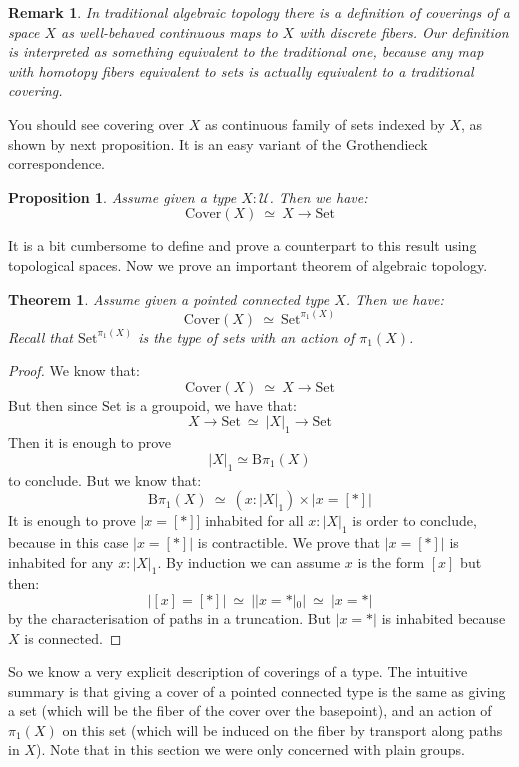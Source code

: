 \documentclass{article}
\newcommand{\U}{{\mathcal U}}
\renewcommand{\r}{\rightarrow}
\newcommand{\B}{\mathrm{B}}
\newcommand{\Set}{\mathrm{Set}}
\newtheorem{proposition}{Proposition}
\newtheorem{theorem}{Theorem}
\newtheorem{remark}{Remark}
\begin{document}
\begin{remark}
In traditional algebraic topology there is a definition of coverings of a space $X$ as well-behaved continuous maps to $X$ with discrete fibers. Our definition is interpreted as something equivalent to the traditional one, because any map with homotopy fibers equivalent to sets is actually equivalent to a traditional covering.
\end{remark}

You should see covering over $X$ as continuous family of sets indexed by $X$, as shown by next proposition. It is an easy variant of the Grothendieck correspondence.

\begin{proposition}
Assume given a type $X:\U$. Then we have:
\[\mathrm{Cover}(X) \ \simeq\ X \r \Set\]
\end{proposition}

It is a bit cumbersome to define and prove a counterpart to this result using topological spaces. Now we prove an important theorem of algebraic topology.

\begin{theorem}
Assume given a pointed connected type $X$. Then we have:
\[\mathrm{Cover}(X) \ \simeq\ \Set^{\pi_1(X)}\]
Recall that $\Set^{\pi_1(X)}$ is the type of sets with an action of $\pi_1(X)$.
\end{theorem}
\begin{proof}
We know that:
\[\mathrm{Cover}(X)\ \simeq\ X\r \Set\]
But then since $\Set$ is a groupoid, we have that:
\[X\r\Set \ \simeq\ |X|_1\r \Set\]
Then it is enough to prove 
\[|X|_1 \simeq \B\pi_1(X)\] 
to conclude. But we know that:
\[\B\pi_1(X) \ \simeq \ (x:|X|_1)\times |x=[*]|\]
It is enough to prove $|x=[*]]$ inhabited for all $x:|X|_1$ is order to conclude, because in this case $|x=[*]|$ is contractible.
We prove that $|x=[*]|$ is inhabited for any $x:|X|_1$. By induction we can assume $x$ is the form $[x]$ but then:
\[|[x]=[*]| \ \simeq \ ||x=*|_0| \ \simeq\ |x=*|\]
by the characterisation of paths in a truncation. But $|x=*|$ is inhabited because $X$ is connected.
\end{proof}

So we know a very explicit description of coverings of a type. The intuitive summary is that giving a cover of a pointed connected type is the same as giving a set (which will be the fiber of the cover over the basepoint), and an action of $\pi_1(X)$ on this set (which will be induced on the fiber by transport along paths in $X$). Note that in this section we were only concerned with plain groups.
\end{document}
